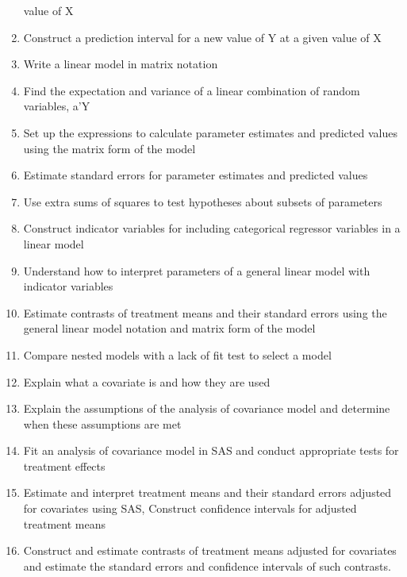 \documentclass[]{book}
\begin{document}
\begin{enumerate}
  value of X
\item
  Construct a prediction interval for a new value of Y at a given value
  of X
\item
  Write a linear model in matrix notation
\item
  Find the expectation and variance of a linear combination of random
  variables, a'Y
\item
  Set up the expressions to calculate parameter estimates and predicted
  values using the matrix form of the model
\item
  Estimate standard errors for parameter estimates and predicted values
\item
  Use extra sums of squares to test hypotheses about subsets of
  parameters
\item
  Construct indicator variables for including categorical regressor
  variables in a linear model
\item
  Understand how to interpret parameters of a general linear model with
  indicator variables
\item
  Estimate contrasts of treatment means and their standard errors using
  the general linear model notation and matrix form of the model
\item
  Compare nested models with a lack of fit test to select a model
\item
  Explain what a covariate is and how they are used
\item
  Explain the assumptions of the analysis of covariance model and
  determine when these assumptions are met
\item
  Fit an analysis of covariance model in SAS and conduct appropriate
  tests for treatment effects
\item
  Estimate and interpret treatment means and their standard errors
  adjusted for covariates using SAS, Construct confidence intervals for
  adjusted treatment means
\item
  Construct and estimate contrasts of treatment means adjusted for
  covariates and estimate the standard errors and confidence intervals
  of such contrasts.
\end{enumerate}
\end{document}
